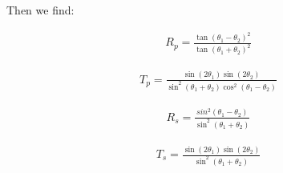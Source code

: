 Then we find:

\begin{align}
R_p = \frac{\tan(\theta_1-\theta_2)^2}{\tan(\theta_1+\theta_2)^2}
\end{align}

\begin{align}
T_p=\frac{\sin(2\theta_1)\sin(2\theta_2)}{\sin^2(\theta_1+\theta_2)\cos^2(\theta_1-\theta_2)}
\end{align}

\begin{align}
R_s = \frac{sin^2(\theta_1-\theta_2)}{\sin^2(\theta_1+\theta_2)}
\end{align}

\begin{align}
T_s = \frac{\sin(2\theta_1)\sin(2\theta_2)}{\sin^2(\theta_1+\theta_2)}
\end{align}

	







